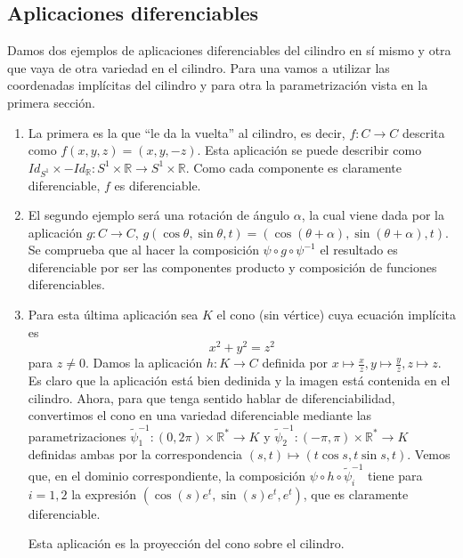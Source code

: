 \documentclass[twoside, 11pt]{article}
\theoremstyle{definition}
\newcommand{\R}{\mathbb{R}}
\begin{document}
\subsection{Aplicaciones diferenciables}
Damos dos ejemplos de aplicaciones diferenciables del cilindro en sí mismo y otra que vaya de otra variedad en el cilindro. Para una vamos a utilizar las coordenadas implícitas del cilindro y para otra la parametrización vista en la primera sección. 


\begin{enumerate}


\item La primera es la que ``le da la vuelta'' al cilindro, es decir, $f:C\to C$ descrita como $f(x,y,z)=(x,y,-z)$. Esta aplicación se puede describir como $Id_{S^1}\times -Id_{\R}:S^1\times\R\to S^1\times\R$. Como cada componente es claramente diferenciable, $f$ es diferenciable. 

\item El segundo ejemplo será una rotación de ángulo $\alpha$, la cual viene dada por la aplicación $g:C\to C$, $g(\cos\theta,\sin\theta, t)=(\cos(\theta+\alpha), \sin(\theta+\alpha), t)$. Se comprueba que al hacer la composición $\psi\circ g\circ \psi^{-1}$ el resultado es diferenciable por ser las componentes producto y composición de funciones diferenciables. 

\item Para esta última aplicación sea $K$ el cono (sin vértice) cuya ecuación implícita es $$x^2+y^2=z^2$$ para $z\neq 0$. Damos la aplicación $h:K\to C$ definida por $x\mapsto \frac{x}{z}, y\mapsto \frac{y}{z}, z\mapsto z$. Es claro que la aplicación está bien dedinida y la imagen está contenida en el cilindro. Ahora, para que tenga sentido hablar de diferenciabilidad, convertimos el cono en una variedad diferenciable mediante las parametrizaciones $\widetilde{\psi}_1^{-1}:(0,2\pi)\times\R^*\to K$ y $\widetilde{\psi}_2^{-1}:(-\pi,\pi)\times\R^*\to K$ definidas ambas por la correspondencia $(s,t)\mapsto (t\cos s, t\sin s, t)$. Vemos que, en el dominio correspondiente, la composición $\psi\circ h\circ \widetilde{\psi}_i^{-1}$ tiene para $i=1,2$  la expresión $(\cos(s)e^t, \sin(s)e^t, e^t)$, que es claramente diferenciable. 

Esta aplicación es la proyección del cono sobre el cilindro. 


\end{enumerate}
\end{document}
